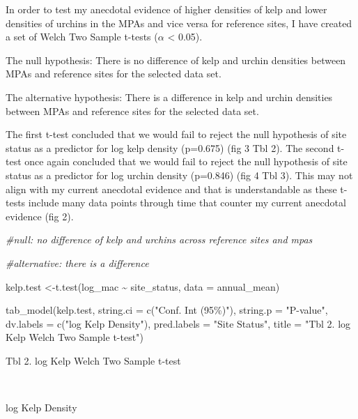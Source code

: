 \documentclass[
]{article}
\newenvironment{Shaded}{\begin{snugshade}}{\end{snugshade}}
\newcommand{\AttributeTok}[1]{\textcolor[rgb]{0.77,0.63,0.00}{#1}}
\newcommand{\CommentTok}[1]{\textcolor[rgb]{0.56,0.35,0.01}{\textit{#1}}}
\newcommand{\FunctionTok}[1]{\textcolor[rgb]{0.00,0.00,0.00}{#1}}
\newcommand{\NormalTok}[1]{#1}
\newcommand{\OtherTok}[1]{\textcolor[rgb]{0.56,0.35,0.01}{#1}}
\newcommand{\SpecialCharTok}[1]{\textcolor[rgb]{0.00,0.00,0.00}{#1}}
\newcommand{\StringTok}[1]{\textcolor[rgb]{0.31,0.60,0.02}{#1}}
\begin{document}
In order to test my anecdotal evidence of higher densities of kelp and
lower densities of urchins in the MPAs and vice versa for reference
sites, I have created a set of Welch Two Sample t-tests (\(\alpha\)
\textless{} 0.05).

The null hypothesis: There is no difference of kelp and urchin densities
between MPAs and reference sites for the selected data set.

The alternative hypothesis: There is a difference in kelp and urchin
densities between MPAs and reference sites for the selected data set.

The first t-test concluded that we would fail to reject the null
hypothesis of site status as a predictor for log kelp density (p=0.675)
(fig 3 Tbl 2). The second t-test once again concluded that we would fail
to reject the null hypothesis of site status as a predictor for log
urchin density (p=0.846) (fig 4 Tbl 3). This may not align with my
current anecdotal evidence and that is understandable as these t-tests
include many data points through time that counter my current anecdotal
evidence (fig 2).

\begin{Shaded}
\begin{Highlighting}[]
\CommentTok{\#null: no difference of kelp and urchins across reference sites and mpas}

\CommentTok{\#alternative: there is a difference}


\NormalTok{kelp.test }\OtherTok{\textless{}{-}}\FunctionTok{t.test}\NormalTok{(log\_mac }\SpecialCharTok{\textasciitilde{}}\NormalTok{ site\_status, }\AttributeTok{data =}\NormalTok{ annual\_mean)}


\FunctionTok{tab\_model}\NormalTok{(kelp.test,}
          \AttributeTok{string.ci =} \FunctionTok{c}\NormalTok{(}\StringTok{"Conf. Int (95\%)"}\NormalTok{),}
          \AttributeTok{string.p =} \StringTok{"P{-}value"}\NormalTok{,}
          \AttributeTok{dv.labels =} \FunctionTok{c}\NormalTok{(}\StringTok{"log Kelp Density"}\NormalTok{),}
          \AttributeTok{pred.labels =} \StringTok{"Site Status"}\NormalTok{,}
          \AttributeTok{title =} \StringTok{"Tbl 2. log Kelp Welch Two Sample t{-}test"}\NormalTok{)}
\end{Highlighting}
\end{Shaded}

Tbl 2. log Kelp Welch Two Sample t-test

~

log Kelp Density
\end{document}
